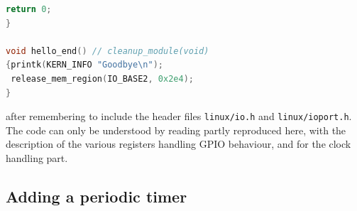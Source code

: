 \documentclass{article}
\begin{document}
{{{\begin{lstlisting}[language=C]
 return 0;
}

void hello_end() // cleanup_module(void)
{printk(KERN_INFO "Goodbye\n");
 release_mem_region(IO_BASE2, 0x2e4);
}
\end{lstlisting}

\noindent
after remembering to include the header files {\tt linux/io.h} and {\tt linux/ioport.h}.
The code can only be understood by reading \cite[p.1347]{zynq} partly reproduced here, with
the description of the various registers handling GPIO behaviour, and \cite[p.1580]{zynq} 
for the clock handling part.

%
%
%
%
%
%
%
%

\subsection{Adding a periodic timer}

}}}
\end{document}

